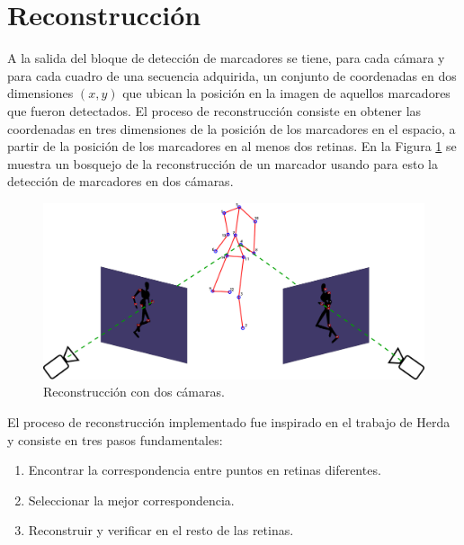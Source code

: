 \section{Reconstrucción}

A la salida del bloque de detección de marcadores se tiene, para cada cámara y para cada cuadro de una secuencia adquirida, un conjunto de coordenadas en dos dimensiones $(x,y)$ que ubican la posición en la imagen de aquellos marcadores que fueron detectados.
El proceso de reconstrucción consiste en obtener las coordenadas en tres dimensiones de la posición de los marcadores en el espacio,  a partir de la posición de los marcadores en al menos dos retinas.
En la Figura \ref{fig: esquema_reconstruccion} se muestra un bosquejo de la reconstrucción de un marcador usando para esto la detección de marcadores en dos cámaras.

\begin{figure}[ht!]
\begin{center}
\includegraphics[scale=0.15]{../imagenes/Reconstruccion/reconstruccion.png}

\caption{Reconstrucción con dos cámaras.}
\label{fig: esquema_reconstruccion}
\end{center}
\end{figure}


El proceso de reconstrucción implementado fue inspirado en el trabajo de Herda \cite{herda} y consiste en tres pasos fundamentales:
\begin{enumerate}
\item Encontrar la correspondencia entre puntos en retinas diferentes.
\item Seleccionar la mejor correspondencia.
\item Reconstruir y verificar en el resto de las retinas.
\end{enumerate}

